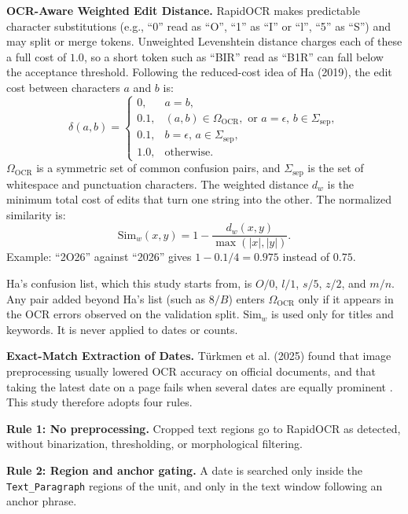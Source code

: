 \textbf{OCR-Aware Weighted Edit Distance.} RapidOCR makes predictable character substitutions (e.g., ``0'' read as ``O'', ``1'' as ``I'' or ``l'', ``5'' as ``S'') and may split or merge tokens. Unweighted Levenshtein distance charges each of these a full cost of $1.0$, so a short token such as ``BIR'' read as ``B1R'' can fall below the acceptance threshold. Following the reduced-cost idea of Ha (2019), the edit cost between characters $a$ and $b$ is:
\begin{equation}
\label{eq:weighted_edit_cost}
\delta(a, b) = \begin{cases}
0, & a = b, \\
0.1, & (a, b) \in \Omega_{\mathrm{OCR}}, \text{ or } a = \epsilon,\, b \in \Sigma_{\mathrm{sep}}, \\
0.1, & b = \epsilon,\, a \in \Sigma_{\mathrm{sep}}, \\
1.0, & \text{otherwise.}
\end{cases}
\end{equation}
$\Omega_{\mathrm{OCR}}$ is a symmetric set of common confusion pairs, and $\Sigma_{\mathrm{sep}}$ is the set of whitespace and punctuation characters. The weighted distance $d_w$ is the minimum total cost of edits that turn one string into the other. The normalized similarity is:
\begin{equation}
\label{eq:weighted_similarity}
\mathrm{Sim}_w(x, y) = 1 - \frac{d_w(x, y)}{\max(|x|, |y|)}.
\end{equation}
Example: ``2O26'' against ``2026'' gives $1 - 0.1/4 = 0.975$ instead of $0.75$.

Ha's confusion list, which this study starts from, is $O/0$, $l/1$, $s/5$, $z/2$, and $m/n$. Any pair added beyond Ha's list (such as $8/B$) enters $\Omega_{\mathrm{OCR}}$ only if it appears in the OCR errors observed on the validation split. $\mathrm{Sim}_w$ is used only for titles and keywords. It is never applied to dates or counts.

\textbf{Exact-Match Extraction of Dates.} Türkmen et al. (2025) found that image preprocessing usually lowered OCR accuracy on official documents, and that taking the latest date on a page fails when several dates are equally prominent \cite{docxb2}. This study therefore adopts four rules.

\textbf{Rule 1: No preprocessing.} Cropped text regions go to RapidOCR as detected, without binarization, thresholding, or morphological filtering.

\textbf{Rule 2: Region and anchor gating.} A date is searched only inside the \texttt{Text\_Paragraph} regions of the unit, and only in the text window following an anchor phrase.

